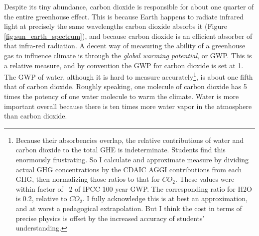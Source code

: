 Despite its tiny abundance, carbon dioxide is responsible for about one quarter of the entire greenhouse effect. This is because Earth happens to radiate infrared light at precisely the same wavelengths carbon dioxide absorbs it (Figure \ref{fig:sun_earth_spectrum}), and because carbon dioxide is an efficient absorber of that infra-red radiation. A decent way of measuring the ability of a greenhouse gas to influence climate is through the \emph{global warming potential}, or GWP. This is a relative measure, and by convention the GWP for carbon dioxide is set at 1. The GWP of water, although it is hard to measure accurately\footnote{Because their absorbencies overlap, the relative contributions of water and carbon dioxide to the total GHE is indeterminate. Students find this enormously frustrating. So I calculate and approximate measure by dividing actual GHG concentrations by the CDAIC AGGI contributions from each GHG, then normalizing those ratios to that for $CO_2$. These values were within factor of ~2 of IPCC 100 year GWP. The corresponding ratio for H2O is 0.2, relative to $CO_2$. I fully acknowledge this is at best an approximation, and at worst a pedagogical extrapolation. But I think the cost in terms of precise physics is offset by the increased accuracy of students' understanding.}, is about one fifth that of carbon dioxide. Roughly speaking, one molecule of carbon dioxide has 5 times the potency of one water molecule to warm the climate. Water is more important overall because there is ten times more water vapor in the atmosphere than carbon dioxide.\\
